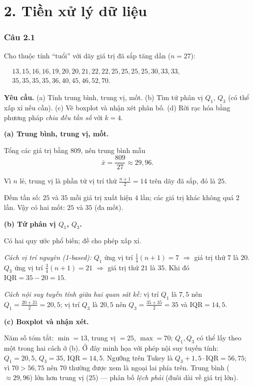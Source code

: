 \section*{2. Tiền xử lý dữ liệu}

\subsubsection*{Câu 2.1}

Cho thuộc tính ``tuổi'' với dãy giá trị đã sắp tăng dần ($n=27$):
\begin{center}
\small
$\begin{aligned}
&13,15,16,16,19,20,20,21,22,22,25,25,25,25,30,33,33,\\
&35,35,35,35,36,40,45,46,52,70.
\end{aligned}$
\end{center}

\textbf{Yêu cầu.} (a) Tính trung bình, trung vị, mốt. (b) Tìm tứ phân vị $Q_1$, $Q_3$ (có thể xấp xỉ nếu cần). (c) Vẽ boxplot và nhận xét phân bố. (d) Rời rạc hóa bằng phương pháp \emph{chia đều tần số} với $k=4$.

\medskip
\textbf{(a) Trung bình, trung vị, mốt.}

Tổng các giá trị bằng $809$, nên trung bình mẫu
\[
\bar x=\frac{809}{27}\approx 29{,}96.
\]

Vì $n$ lẻ, trung vị là phần tử vị trí thứ $\frac{n+1}{2}=14$ trên dãy đã sắp, đó là $25$.

Đếm tần số: $25$ và $35$ mỗi giá trị xuất hiện $4$ lần; các giá trị khác không quá $2$ lần. Vậy có hai mốt: $25$ và $35$ (đa mốt).

\textbf{(b) Tứ phân vị $Q_1$, $Q_3$.}

Có hai quy ước phổ biến; đề cho phép xấp xỉ.

\emph{Cách vị trí nguyên (1-based):} $Q_1$ ứng vị trí $\frac{1}{4}(n+1)=7$ $\Rightarrow$ giá trị thứ $7$ là $20$. $Q_3$ ứng vị trí $\frac{3}{4}(n+1)=21$ $\Rightarrow$ giá trị thứ $21$ là $35$. Khi đó $\mathrm{IQR}=35-20=15$.

\emph{Cách nội suy tuyến tính giữa hai quan sát kề:} vị trí $Q_1$ là $7{,}5$ nên $Q_1=\frac{20+21}{2}=20{,}5$; vị trí $Q_3$ là $20{,}5$ nên $Q_3=\frac{35+35}{2}=35$ và $\mathrm{IQR}=14{,}5$.

\textbf{(c) Boxplot và nhận xét.}

Năm số tóm tắt: $\min=13$, trung vị $=25$, $\max=70$; $Q_1,Q_3$ có thể lấy theo một trong hai cách ở (b). Ở đây minh họa với phép nội suy tuyến tính: $Q_1=20{,}5$, $Q_3=35$, $\mathrm{IQR}=14{,}5$. Ngưỡng trên Tukey là $Q_3+1{,}5\cdot\mathrm{IQR}=56{,}75$; vì $70>56{,}75$ nên $70$ thường được xem là ngoại lai phía trên. Trung bình ($\approx29{,}96$) lớn hơn trung vị ($25$) --- phân bố \emph{lệch phải} (đuôi dài về giá trị lớn).

